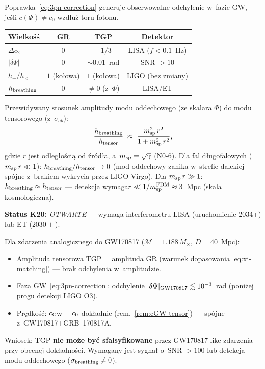 \begin{remark}%
\label{rem:k20-3pn}
Poprawka~\eqref{eq:3pn-correction} generuje obserwowalne odchylenie
w~fazie GW, je\'sli $c(\Phi) \neq c_0$ wzdlu\.z toru fotonu.
\begin{center}
\begin{tabular}{@{}lccc@{}}
\toprule
\textbf{Wielko\'s\'s}  & \textbf{GR} & \textbf{TGP} & \textbf{Detektor} \\
\midrule
$\Delta c_2$     & $0$            & $-1/3$              & LISA ($f < 0.1$~Hz) \\
$|\delta\Psi|$   & $0$            & $\sim 0.01$~rad     & SNR $> 10$       \\
$h_+/h_\times$   & $1$ (kołowa)   & $1$ (kołowa)        & LIGO (bez zmiany) \\
$h_{\rm breathing}$ & $0$         & $\neq 0$ (z~$\Phi$) & LISA/ET         \\
\bottomrule
\end{tabular}
\end{center}

Przewidywany stosunek amplitudy modu oddechowego
(ze skalara $\Phi$) do modu tensorowego (z~$\sigma_{ab}$):
\begin{equation}\label{eq:breathing-to-tensor}
  \frac{h_{\rm breathing}}{h_{\rm tensor}}
  \;\approx\; \frac{m_{\rm sp}^2\,r^2}{1 + m_{\rm sp}^2\,r^2},
\end{equation}
gdzie $r$ jest odleg\l{}o\'sci\k{a} od \'zr\'od\l{}a,
a~$m_{\rm sp} = \sqrt{\gamma}$ (N0-6).
Dla fal d\l{}ugofalowych ($m_{\rm sp}\,r \ll 1$):
$h_{\rm breathing}/h_{\rm tensor} \to 0$
(mod oddechowy zanika w~strefie dalekiej --- sp\'ojne
z~brakiem wykrycia przez LIGO-Virgo).
Dla $m_{\rm sp}\,r \gg 1$: $h_{\rm breathing} \approx h_{\rm tensor}$
--- detekcja wymaga$r \ll 1/m_{\rm sp}^{\rm FDM}
\approx 3$~Mpc (skala kosmologiczna).

\textbf{Status K20:} \emph{OTWARTE} --- wymaga interferometru LISA
(uruchomienie 2034+) lub ET ($2030+$).
\end{remark}

\begin{remark}%
\label{rem:gw-bns}
Dla zdarzenia analogicznego do GW170817
($\mathcal{M} = 1.188\,M_\odot$, $D = 40$~Mpc):
\begin{itemize}[nosep]
  \item Amplituda tensorowa TGP = amplituda GR
    (warunek dopasowania \eqref{eq:xi-matching}) --- brak odchylenia
    w~amplitudzie.
  \item Faza GW~\eqref{eq:3pn-correction}: odchylenie
    $|\delta\Psi|_{\rm GW170817} \lesssim 10^{-3}$~rad
    (poni\.zej progu detekcji LIGO O3).
  \item Pr\k{e}dko\'s\'c: $c_{\rm GW} = c_0$ dok\l{}adnie
    (rem.~\ref{rem:cGW-tensor}) --- sp\'ojne z~GW170817+GRB~170817A.
\end{itemize}
Wniosek: TGP \textbf{nie mo\.ze by\'c sfalsyfikowane}
przez GW170817-like zdarzenia przy obecnej dok\l{}adno\'sci.
Wymagany jest sygna\l{} o~SNR $> 100$ lub
detekcja modu oddechowego ($\sigma_{\rm breathing} \neq 0$).
\end{remark}

